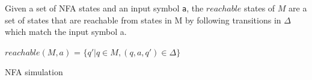 \begin{mydef}
Given a set of NFA states and an input symbol {\tt a}, the $reachable$ states of $M$ are a set of states that are reachable from states in M by following transitions in $\Delta$ which match the input symbol a. 
\begin{center}
$reachable(M,a)$ = $\{q'|q \in M,(q,a,q')\in \Delta \}$
\end{center}
\end{mydef}
\begin{algorithm}[h!]
  \caption{NFA simulation}
    \label{nfaalg1}
  \begin{algorithmic}[1]
            \State {}
        \EndIf
      \EndFor
        \State {}
      \EndIf
      \State {}
    \EndFunction
  \end{algorithmic}
\end{algorithm}
\newpage
